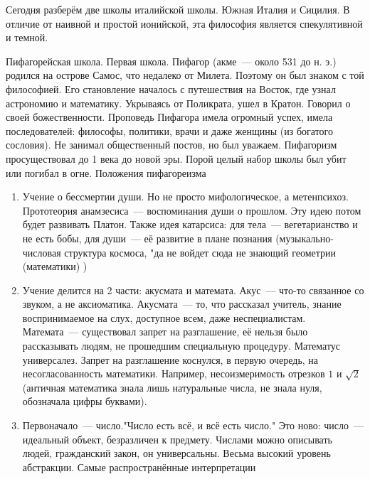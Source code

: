 Сегодня разберём две школы италийской школы. Южная Италия и Сицилия. 
В отличие от наивной и простой ионийской, эта философия является спекулятивной и темной. 

Пифагорейская школа. 
Первая школа. 
Пифагор (акме~--- около 531 до н. э.) родился на острове Самос, что недалеко от Милета. Поэтому он был знаком с той философией. 
Его становление началось с путешествия на Восток, где узнал астрономию и математику. Укрываясь от Поликрата, ушел в Кратон. Говорил о своей божественности. 
Проповедь Пифагора имела огромный успех, имела последователей: философы, политики, врачи и даже женщины (из богатого сословия). Не занимал общественный постов, но был уважаем. 
Пифагоризм просуществовал до 1 века до новой эры. Порой целый набор школы был убит или погибал в огне. 
Положения пифагореизма

\begin{enumerate}
	\item Учение о бессмертии души. Но не просто мифологическое, а метенпсихоз. Прототеория анамзесиса~--- воспоминания души о прошлом. Эту идею потом будет развивать Платон. 
	Также идея катарсиса: для тела~--- вегетарианство и не есть бобы, для души~--- её развитие в плане познания (музыкально-числовая структура космоса, "да не войдет сюда не знающий геометрии (математики) ) 
	\item Учение делится на 2 части: акусмата и математа. Акус~--- что-то связанное со звуком, а не аксиоматика. Акусмата~--- то, что рассказал учитель, знание воспринимаемое на слух, доступное всем, даже неспециалистам. Математа~--- существовал запрет на разглашение, её нельзя было рассказывать людям, не прошедшим специальную процедуру. 
	Математус универсалез. Запрет на разглашение коснулся, в первую очередь, на несогласованность математики. 
	Например, несоизмеримость отрезков $1$ и $\sqrt{2}$ (античная математика знала лишь натуральные числа, не знала нуля, обозначала цифры буквами). 
	\item Первоначало~--- число."Число есть всё, и всё есть число." Это ново: число~--- идеальный объект, безразличен к предмету. 
	Числами можно описывать людей, гражданский закон, он универсальны. Весьма высокий уровень абстракции. Самые распространённые интерпретации
\end{enumerate}

